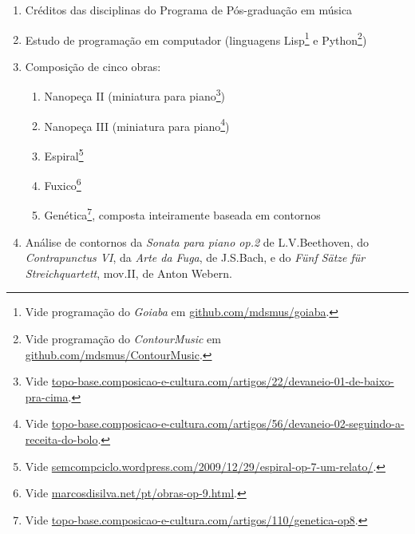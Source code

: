 \documentclass[12pt]{article}
\newcommand{\opus}[1]{\textit{#1}}
\begin{document}
\begin{enumerate}
\item Créditos das disciplinas do Programa de Pós-graduação em música
\item Estudo de programação em computador (linguagens
  Lisp\footnote{Vide programação do \textit{Goiaba} em
    \url{github.com/mdsmus/goiaba}.} e Python\footnote{Vide
    programação do \textit{ContourMusic} em
    \url{github.com/mdsmus/ContourMusic}.})
\item Composição de cinco obras:
\begin{enumerate}
\item Nanopeça II (miniatura para piano\footnote{Vide
    \url{topo-base.composicao-e-cultura.com/artigos/22/devaneio-01-de-baixo-pra-cima}.})
\item Nanopeça III (miniatura para piano\footnote{Vide
    \url{topo-base.composicao-e-cultura.com/artigos/56/devaneio-02-seguindo-a-receita-do-bolo}.})
\item Espiral\footnote{Vide
  \url{semcompciclo.wordpress.com/2009/12/29/espiral-op-7-um-relato/}.}
\item Fuxico\footnote{Vide
    \url{marcosdisilva.net/pt/obras-op-9.html}.}
\item Genética\footnote{Vide
    \url{topo-base.composicao-e-cultura.com/artigos/110/genetica-op8}.},
  composta inteiramente baseada em contornos
\end{enumerate}
\item Análise de contornos da \opus{Sonata para piano op.2} de
  L.V.Beethoven, do \opus{Contrapunctus VI}, da \opus{Arte da Fuga},
  de J.S.Bach, e do \opus{Fünf Sätze für Streichquartett}, mov.II, de
  Anton Webern.
\end{enumerate}

\end{document}
